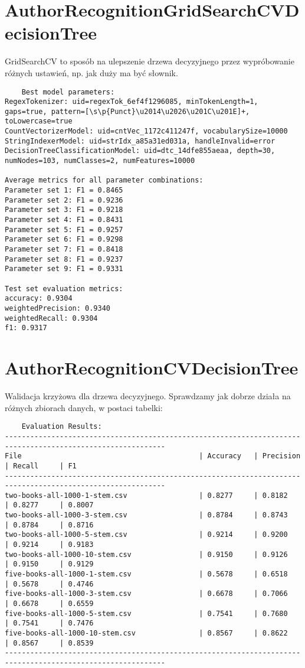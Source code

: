 \documentclass{article}
\begin{document}
\section{AuthorRecognitionGridSearchCVDecisionTree}
GridSearchCV to sposób na ulepszenie drzewa decyzyjnego przez wypróbowanie różnych ustawień, np. jak duży ma być słownik.

\begin{verbatim}
    Best model parameters:
RegexTokenizer: uid=regexTok_6ef4f1296085, minTokenLength=1, gaps=true, pattern=[\s\p{Punct}\u2014\u2026\u201C\u201E]+, toLowercase=true
CountVectorizerModel: uid=cntVec_1172c411247f, vocabularySize=10000
StringIndexerModel: uid=strIdx_a85a31ed031a, handleInvalid=error
DecisionTreeClassificationModel: uid=dtc_14dfe855aeaa, depth=30, numNodes=103, numClasses=2, numFeatures=10000

Average metrics for all parameter combinations:
Parameter set 1: F1 = 0.8465
Parameter set 2: F1 = 0.9236
Parameter set 3: F1 = 0.9218
Parameter set 4: F1 = 0.8431
Parameter set 5: F1 = 0.9257
Parameter set 6: F1 = 0.9298
Parameter set 7: F1 = 0.8418
Parameter set 8: F1 = 0.9237
Parameter set 9: F1 = 0.9331

Test set evaluation metrics:
accuracy: 0.9304
weightedPrecision: 0.9340
weightedRecall: 0.9304
f1: 0.9317
\end{verbatim}


\section{AuthorRecognitionCVDecisionTree}
Walidacja krzyżowa dla drzewa decyzyjnego. Sprawdzamy jak dobrze działa na różnych zbiorach danych, w postaci tabelki:

\begin{verbatim}
    Evaluation Results:
------------------------------------------------------------------------------------------------------------
File                                          | Accuracy   | Precision  | Recall     | F1        
------------------------------------------------------------------------------------------------------------
two-books-all-1000-1-stem.csv                 | 0.8277     | 0.8182     | 0.8277     | 0.8007    
two-books-all-1000-3-stem.csv                 | 0.8784     | 0.8743     | 0.8784     | 0.8716    
two-books-all-1000-5-stem.csv                 | 0.9214     | 0.9200     | 0.9214     | 0.9183    
two-books-all-1000-10-stem.csv                | 0.9150     | 0.9126     | 0.9150     | 0.9129    
five-books-all-1000-1-stem.csv                | 0.5678     | 0.6518     | 0.5678     | 0.4746    
five-books-all-1000-3-stem.csv                | 0.6678     | 0.7066     | 0.6678     | 0.6559    
five-books-all-1000-5-stem.csv                | 0.7541     | 0.7680     | 0.7541     | 0.7476    
five-books-all-1000-10-stem.csv               | 0.8567     | 0.8622     | 0.8567     | 0.8539    
------------------------------------------------------------------------------------------------------------
\end{verbatim}
\end{document}
